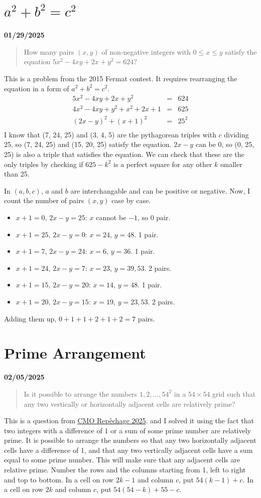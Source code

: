 \documentclass[12pt, oneside]{article}
\begin{document}
\section*{$a^2 + b^2 = c^2$}
\textbf{01/29/2025}
\begin{quote}
How many pairs $(x, y)$ of non-negative integers with $0 \leq x \leq y$ satisfy the equation $5x^2 - 4xy + 2x + y^2 = 624$?
\end{quote}
This is a problem from the 2015 Fermat contest. It requires rearranging the equation in a form of $a^2 + b^2 = c^2$.
\begin{eqnarray*}
5x^2 - 4xy + 2x + y^2 &=& 624\\
4x^2 - 4xy + y^2 + x^2 + 2x + 1&=& 625\\
(2x-y)^2 + (x+1)^2&=& 25^2\\
\end{eqnarray*}
I know that (7, 24, 25) and (3, 4, 5) are the pythagorean triples with $c$ dividing 25, so (7, 24, 25) and (15, 20, 25) satisfy the equation. $2x-y$ can be 0, so (0, 25, 25) is also a triple that satisfies the equation. We can check that these are the only triples by checking if $625 - k^2$ is a perfect square for any other $k$ smaller than 25. 

In $(a, b, c)$, $a$ and $b$ are interchangable and can be positive or negative. Now, I count the number of pairs $(x, y)$ case by case.
\begin{itemize}
\item $x+1 = 0$, $2x-y = 25$: $x$ cannot be $-1$, so 0 pair.
\item $x+1 = 25$, $2x-y = 0$: $x=24$, $y=48$. 1 pair.
\item $x+1 = 7$, $2x-y = 24$: $x=6$, $y=36$. 1 pair.
\item $x+1 = 24$, $2x-y = 7$: $x=23$, $y=39, 53$. 2 pairs.
\item $x+1 = 15$, $2x-y = 20$: $x=14$, $y=48$. 1 pair.
\item $x+1 = 20$, $2x-y = 15$: $x=19$, $y=23, 53$. 2 pairs.
\end{itemize}
Adding them up, $0+1+1+2+1+2=7$ pairs.
\section*{Prime Arrangement}
\textbf{02/05/2025}
\begin{quote}
Is it possible to arrange the numbers $1, 2,\dots, 54^2$ in a $54 \times 54$ grid such that any two vertically or horizontally adjacent cells are relatively prime?
\end{quote}
This is a question from \href{https://cms.math.ca/wp-content/uploads/2025/02/repechage-2025-problems.pdf}{CMO Repêchage 2025}. and I solved it using the fact that two integers with a difference of 1 or a sum of some prime number are relatively prime. It is possible to arrange the numbers so that any two horizontally adjacent cells have a difference of 1, and that any two vertically adjacent cells have a sum equal to some prime number. This will make sure that any adjacent cells are relative prime. Number the rows and the columns starting from 1, left to right and top to bottom. In a cell on row $2k-1$ and column $c$, put $54(k-1)+c$. In a cell on row $2k$ and column $c$, put $54(54-k)+55-c$.
\end{document}
